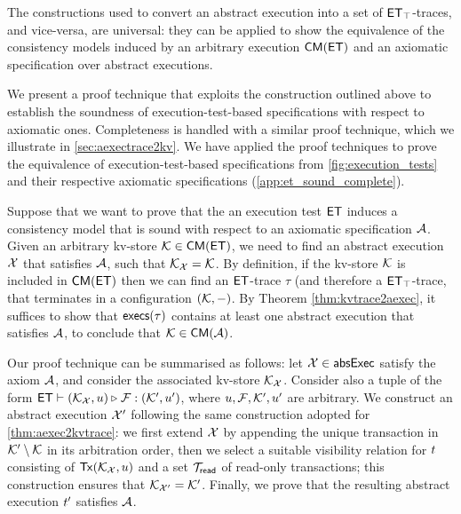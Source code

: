 The constructions used to convert an abstract execution 
into a  set of $\mathsf{ET}_{\top}$-traces, and vice-versa, are universal:  they can be applied to show the 
equivalence of  the consistency models induced by an arbitrary execution $\CMs(\ET)$ 
and an axiomatic specification over abstract executions. 

We present a proof technique that exploits the construction outlined 
above to establish the soundness of execution-test-based specifications with respect to axiomatic 
ones. Completeness is handled with a similar proof technique, which we illustrate in 
\cref{sec:aexectrace2kv}.
We have applied the proof techniques to prove the equivalence of execution-test-based specifications from \cref{fig:execution_tests} 
and their respective axiomatic specifications (\cref{app:et_sound_complete}).

Suppose that we want to prove that the an execution test $\mathsf{ET}$ induces a consistency model that is sound with respect 
to an axiomatic specification $\mathcal{A}$. Given an arbitrary kv-store $\hh \in \CMs(\ET)$, 
we need to find an abstract execution $\mathcal{X}$ that satisfies $\mathcal{A}$, such that $\mathcal{K}_{\mathcal{X}} = \mathcal{K}$. 
By definition, if the kv-store $\mathcal{K}$ is included in $\CMs(\ET)$ then 
we can find an $\mathsf{ET}$-trace $\tau$ (and therefore a $\mathsf{ET}_{\top}$-trace, that terminates in a configuration $(\mathcal{K}, -)$. 
By Theorem \ref{thm:kvtrace2aexec}, it suffices to show that $\execs(\tau)$
contains at least one abstract execution that satisfies $\mathcal{A}$, to conclude 
that $\hh \in \CMs(\Ax)$. 

Our proof technique can be summarised as follows: let $\aexec \in \aeset$ satisfy
the axiom $\mathcal{A}$, and consider the associated kv-store $\mathcal{K}_{\mathcal{X}}$. Consider 
also a tuple of the form $\mathsf{ET} \vdash (\mathcal{K}_{\mathcal{X}}, u) \triangleright_{} \mathcal{F}: (\mathcal{K}', u')$, 
where $u, \mathcal{F}, \mathcal{K}', u'$ are arbitrary. We construct an abstract execution 
$\mathcal{X}'$ following the same construction adopted for \cref{thm:aexec2kvtrace}:  
we first extend $\mathcal{X}$ by appending the unique transaction in $\mathcal{K}' \setminus \mathcal{K}$ 
in its arbitration order, 
then we select a suitable visibility relation for $t$ consisting of $\Tx(\hh_{\aexec}, \vi)$ and 
a set $\mathcal{T}_{\mathsf{read}}$ of read-only transactions; 
this construction ensures that $\mathcal{K}_{\mathcal{X}'} = \mathcal{K}'$. 
Finally, we prove that the resulting abstract execution $t'$ satisfies $\mathcal{A}$. 

